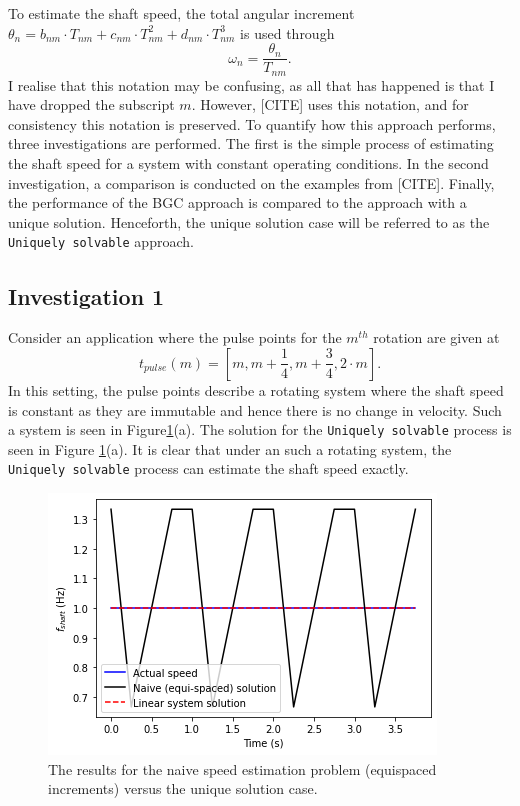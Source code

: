 \documentclass{article}
\begin{document}
	To estimate the shaft speed, the total angular increment $\theta_{n} = b_{nm} \cdot T_{nm} + c_{nm} \cdot T_{nm}^2 + d_{nm} \cdot T_{nm}^3$ is used through
	\begin{equation}\label{eq:speed}
		\omega_n = \frac{\theta_n}{T_{nm}}.
	\end{equation}
	I realise that this notation may be confusing, as all that has happened is that I have dropped the subscript $m$. However, [CITE] uses this notation, and for consistency this notation is preserved. To quantify how this approach performs, three investigations are performed. The first is the simple process of estimating the shaft speed for a system with constant operating conditions. In the second investigation, a comparison is conducted on the examples from [CITE]. Finally, the performance of the BGC approach is compared to the approach with a unique solution. Henceforth, the unique solution case will be referred to as the \texttt{Uniquely solvable} approach. 
	
	\subsection{Investigation 1}
	
	Consider an application where the pulse points for the $m^{th}$ rotation are given at
	\begin{equation}
		t_{pulse}(m) = [m, m + \frac{1}{4}, m + \frac{3}{4}, 2 \cdot m].
	\end{equation}
	In this setting, the pulse points describe a rotating system where the shaft speed is constant as they are immutable and hence there is no change in velocity. Such a system is seen in Figure\ref{fig:Q4_constant}(a). The solution for the \texttt{Uniquely solvable} process is seen in Figure \ref{fig:Q4_constant}(a). It is clear that under an such a rotating system, the \texttt{Uniquely solvable} process can estimate the shaft speed exactly.
	\begin{figure}[htb!]
		\centering
		\includegraphics[scale=0.4]{Q4_1.png}
		\caption{The results for the naive speed estimation problem (equispaced increments) versus the unique solution case.}
		\label{fig:Q4_constant}
	\end{figure}
\end{document}
